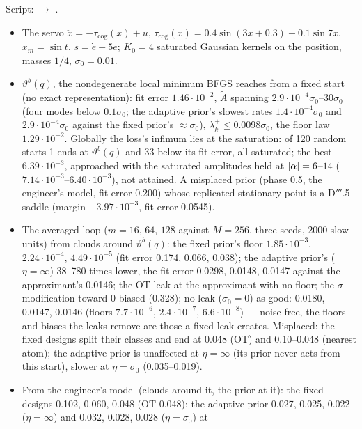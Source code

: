 Script:  $\to$ .
\begin{itemize}
  \item The servo $\ddot x=-\tau_{\mathrm{cog}}(x)+u$, $\tau_{\mathrm{cog}}(x)=0.4\sin(3x+0.3)+0.1\sin7x$,
    $x_m=\sin t$, $s=\dot e+5e$; $K_0=4$ saturated Gaussian kernels on the position, masses $1/4$, $\sigma_0=0.01$.
  \item $\vartheta^b(q)$, the nondegenerate local minimum BFGS reaches from a fixed start (no exact representation):
    fit error $1.46\cdot10^{-2}$, $\tilde A$ spanning $2.9\cdot10^{-4}\sigma_0$--$30\sigma_0$ (four modes below
    $0.1\sigma_0$; the adaptive prior's slowest rates $1.4\cdot10^{-4}\sigma_0$ and $2.9\cdot10^{-4}\sigma_0$ against
    the fixed prior's $\approx\sigma_0$), $\lambda^+_k\le0.0098\sigma_0$, the floor law $1.29\cdot10^{-2}$. Globally
    the loss's infimum lies at the saturation: of 120 random starts 1 ends at $\vartheta^b(q)$ and 33 below its fit
    error, all saturated; the best $6.39\cdot10^{-3}$, approached with the saturated amplitudes held at
    $\lvert \alpha\rvert=6$--$14$ ($7.14\cdot10^{-3}$--$6.40\cdot10^{-3}$), not attained. A misplaced prior (phase 0.5, the
    engineer's model, fit error 0.200) whose replicated stationary point is a D$'''$.5 saddle (margin
    $-3.97\cdot10^{-3}$, fit error 0.0545).
  \item The averaged loop ($m=16$, $64$, $128$ against $M=256$, three seeds, 2000 slow units) from clouds around
    $\vartheta^b(q)$: the fixed prior's floor $1.85\cdot10^{-3}$, $2.24\cdot10^{-4}$, $4.49\cdot10^{-5}$ (fit error
    0.174, 0.066, 0.038); the adaptive prior's ($\eta=\infty$) 38--780 times lower, the fit error 0.0298, 0.0148,
    0.0147 against the approximant's 0.0146; the OT leak at the approximant with no floor; the $\sigma$-modification
    toward 0 biased (0.328); no leak ($\sigma_0=0$) as good: 0.0180, 0.0147, 0.0146 (floors $7.7\cdot10^{-6}$,
    $2.4\cdot10^{-7}$, $6.6\cdot10^{-8}$) --- noise-free, the floors and biases the leaks remove are those a fixed leak
    creates. Misplaced: the fixed designs split their classes and end at 0.048 (OT) and 0.10--0.048 (nearest atom);
    the adaptive prior is unaffected at $\eta=\infty$ (its prior never acts from this start), slower at
    $\eta=\sigma_0$ (0.035--0.019).
  \item From the engineer's model (clouds around it, the prior at it): the fixed designs 0.102, 0.060, 0.048 (OT
    0.048); the adaptive prior 0.027, 0.025, 0.022 ($\eta=\infty$) and 0.032, 0.028, 0.028 ($\eta=\sigma_0$) at

\end{itemize}
